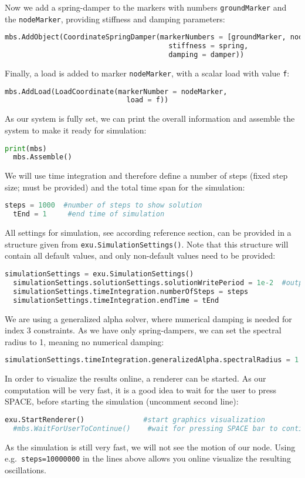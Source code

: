 Now we add a spring-damper to the markers with numbers \texttt{groundMarker} and the \texttt{nodeMarker}, providing stiffness and damping parameters:
\begin{lstlisting}[language=Python, firstnumber=29]
  mbs.AddObject(CoordinateSpringDamper(markerNumbers = [groundMarker, nodeMarker], 
                                       stiffness = spring, 
                                       damping = damper)) 
\end{lstlisting}
%
Finally, a load is added to marker \texttt{nodeMarker}, with a scalar load with value \texttt{f}:
\begin{lstlisting}[language=Python, firstnumber=32]
  mbs.AddLoad(LoadCoordinate(markerNumber = nodeMarker, 
                             load = f))
\end{lstlisting}
%
As our system is fully set, we can print the overall information and assemble the system to make it ready for simulation:
\begin{lstlisting}[language=Python, firstnumber=34]
  print(mbs)
  mbs.Assemble()
\end{lstlisting}
%
We will use time integration and therefore define a number of steps (fixed step size; must be provided) and the total time span for the simulation:
\begin{lstlisting}[language=Python, firstnumber=36]
  steps = 1000  #number of steps to show solution
  tEnd = 1     #end time of simulation
\end{lstlisting}
%
All settings for simulation, see according reference section, can be provided in a structure given from \texttt{exu.SimulationSettings()}. Note that this structure will contain all default values, and only non-default values need to be provided:
\begin{lstlisting}[language=Python, firstnumber=38]
  simulationSettings = exu.SimulationSettings()
  simulationSettings.solutionSettings.solutionWritePeriod = 1e-2  #output interval
  simulationSettings.timeIntegration.numberOfSteps = steps
  simulationSettings.timeIntegration.endTime = tEnd
\end{lstlisting}
%
We are using a generalized alpha solver, where numerical damping is needed for index 3 constraints. As we have only spring-dampers, we can set the spectral radius to 1, meaning no numerical damping:
\begin{lstlisting}[language=Python, firstnumber=42]
  simulationSettings.timeIntegration.generalizedAlpha.spectralRadius = 1
\end{lstlisting}
%
In order to visualize the results online, a renderer can be started. As our computation will be very fast, it is a good idea to wait for the user to press SPACE, before starting the simulation (uncomment second line):
\begin{lstlisting}[language=Python, firstnumber=43]
  exu.StartRenderer()              #start graphics visualization
  #mbs.WaitForUserToContinue()    #wait for pressing SPACE bar to continue
\end{lstlisting}
As the simulation is still very fast, we will not see the motion of our node. Using e.g.\ \texttt{steps=10000000} in the lines above allows you online visualize the resulting oscillations.


